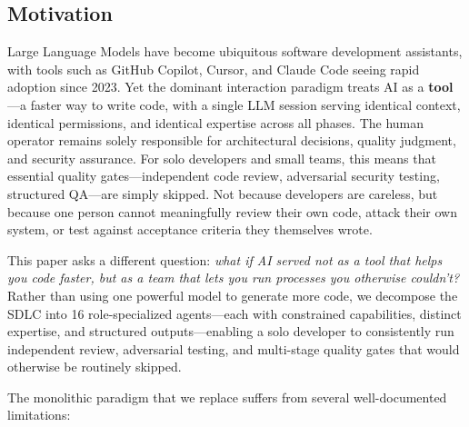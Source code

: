 \documentclass[a4paper,USenglish,cleveref,autoref]{lipics-v2021}
\begin{document}
\subsection{Motivation}

Large Language Models have become ubiquitous software development assistants, with tools such as GitHub Copilot, Cursor, and Claude Code seeing rapid adoption since 2023. Yet the dominant interaction paradigm treats AI as a \textbf{tool}---a faster way to write code, with a single LLM session serving identical context, identical permissions, and identical expertise across all phases. The human operator remains solely responsible for architectural decisions, quality judgment, and security assurance. For solo developers and small teams, this means that essential quality gates---independent code review, adversarial security testing, structured QA---are simply skipped. Not because developers are careless, but because one person cannot meaningfully review their own code, attack their own system, or test against acceptance criteria they themselves wrote.

This paper asks a different question: \emph{what if AI served not as a tool that helps you code faster, but as a team that lets you run processes you otherwise couldn't?} Rather than using one powerful model to generate more code, we decompose the SDLC into 16 role-specialized agents---each with constrained capabilities, distinct expertise, and structured outputs---enabling a solo developer to consistently run independent review, adversarial testing, and multi-stage quality gates that would otherwise be routinely skipped.

The monolithic paradigm that we replace suffers from several well-documented limitations:
\end{document}
